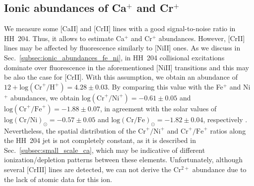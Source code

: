 \documentclass[twocolumn,linenumbers]{aastex63}
\begin{document}


\subsection{Ionic abundances of Ca$^{+}$ and Cr$^{+}$}
\label{subsec:ionic_abundances_rare}

We measure some [Ca\thinspace II] and [Cr\thinspace II] lines with a good signal-to-noise ratio in HH~204. Thus, it allows to estimate Ca$^{+}$ and Cr$^{+}$ abundances. However, [Cr\thinspace II] lines may be affected by fluorescence similarly to [Ni\thinspace II] ones. As we discuss in Sec.~\ref{subsec:ionic_abundances_fe_ni}, in HH~204 collisional excitations dominate over fluorescence in the aforementioned [Ni\thinspace II] transitions and this may be also the case for [Cr\thinspace II]. With this assumption, we obtain an abundance of $12+\text{log}(\text{Cr}^{+}/\text{H}^{+})=4.28\pm 0.03$. By comparing this value with the Fe$^{+}$ and Ni$^{+}$ abundances, we obtain $\text{log}(\text{Cr}^{+}/\text{Ni}^{+})=-0.61\pm 0.05$ and $\text{log}(\text{Cr}^{+}/\text{Fe}^{+})=-1.88\pm 0.07$, in agreement with the solar values of  $\text{log}(\text{Cr} /\text{Ni})_{\odot}=-0.57\pm 0.05$ and $\text{log}(\text{Cr}/\text{Fe})_{\odot}=-1.82\pm 0.04$, respectively \citep{lodders19}. Nevertheless, the spatial distribution of the $\text{Cr}^{+}/\text{Ni}^{+}$ and $\text{Cr}^{+}/\text{Fe}^{+}$ ratios along the HH~204 jet is not completely constant, as it is described in Sec.~\ref{subsec:small_scale_ca}, which may be indicative of different ionization/depletion patterns between these elements. Unfortunately, although several [Cr\thinspace III] lines are detected, we can not derive the Cr$^{2+}$ abundance due to the lack of atomic data for this ion.
\end{document}
